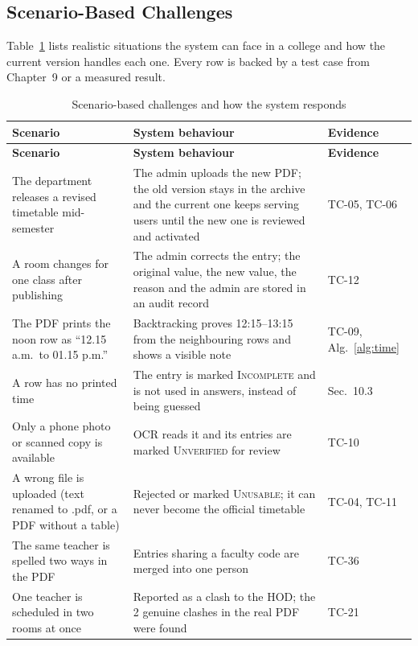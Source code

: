 \subsection{Scenario-Based Challenges}
Table~\ref{tab:scenarios} lists realistic situations the system can face in a college and how the
current version handles each one. Every row is backed by a test case from Chapter~9 or a measured
result.
\begingroup
\small
\begin{longtable}{@{}>{\raggedright\arraybackslash}p{4.2cm}>{\raggedright\arraybackslash}p{7.3cm}>{\raggedright\arraybackslash}p{2.6cm}@{}}
\caption{Scenario-based challenges and how the system responds}\label{tab:scenarios}\\
\toprule
\textbf{Scenario} & \textbf{System behaviour} & \textbf{Evidence}\\
\midrule
\endfirsthead
\toprule
\textbf{Scenario} & \textbf{System behaviour} & \textbf{Evidence}\\
\midrule
\endhead
The department releases a revised timetable mid-semester & The admin uploads the new PDF; the old version stays in the archive and the current one keeps serving users until the new one is reviewed and activated & TC-05, TC-06\\
A room changes for one class after publishing & The admin corrects the entry; the original value, the new value, the reason and the admin are stored in an audit record & TC-12\\
The PDF prints the noon row as ``12.15 a.m.\ to 01.15 p.m.'' & Backtracking proves 12:15--13:15 from the neighbouring rows and shows a visible note & TC-09, Alg.~\ref{alg:time}\\
A row has no printed time & The entry is marked \textsc{Incomplete} and is not used in answers, instead of being guessed & Sec.~10.3\\
Only a phone photo or scanned copy is available & OCR reads it and its entries are marked \textsc{Unverified} for review & TC-10\\
A wrong file is uploaded (text renamed to .pdf, or a PDF without a table) & Rejected or marked \textsc{Unusable}; it can never become the official timetable & TC-04, TC-11\\
The same teacher is spelled two ways in the PDF & Entries sharing a faculty code are merged into one person & TC-36\\
One teacher is scheduled in two rooms at once & Reported as a clash to the HOD; the 2 genuine clashes in the real PDF were found & TC-21\\

\end{longtable}
